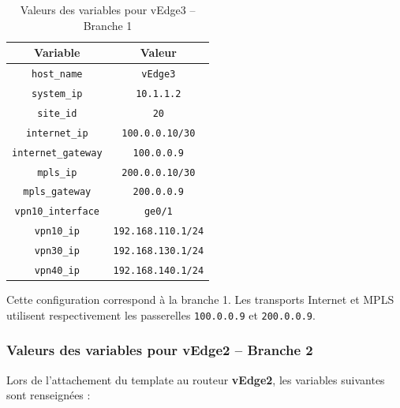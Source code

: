 \documentclass[12pt,a4paper,oneside]{report}
\begin{document}
	\begin{table}[H]
		\centering
		\renewcommand{\arraystretch}{1.2}
		\begin{tabular}{|c|c|}
			\hline
			\textbf{Variable} & \textbf{Valeur} \\
			\hline
			\texttt{host\_name} & \texttt{vEdge3} \\
			\hline
			\texttt{system\_ip} & \texttt{10.1.1.2} \\
			\hline
			\texttt{site\_id} & \texttt{20} \\
			\hline
			\texttt{internet\_ip} & \texttt{100.0.0.10/30} \\
			\hline
			\texttt{internet\_gateway} & \texttt{100.0.0.9} \\
			\hline
			\texttt{mpls\_ip} & \texttt{200.0.0.10/30} \\
			\hline
			\texttt{mpls\_gateway} & \texttt{200.0.0.9} \\
			\hline
			\texttt{vpn10\_interface} & \texttt{ge0/1} \\
			\hline
			\texttt{vpn10\_ip} & \texttt{192.168.110.1/24} \\
			\hline
			\texttt{vpn30\_ip} & \texttt{192.168.130.1/24} \\
			\hline
			\texttt{vpn40\_ip} & \texttt{192.168.140.1/24} \\
			\hline
		\end{tabular}
		\caption{Valeurs des variables pour vEdge3 -- Branche 1}
		\label{tab:variables-vedge3}
	\end{table}
	
	Cette configuration correspond à la branche 1. 
	Les transports Internet et MPLS utilisent respectivement les passerelles \texttt{100.0.0.9} et \texttt{200.0.0.9}.
	
	\subsubsection{Valeurs des variables pour vEdge2 -- Branche 2}
	
	Lors de l'attachement du template au routeur \textbf{vEdge2}, les variables suivantes sont renseignées :
	
\end{document}
